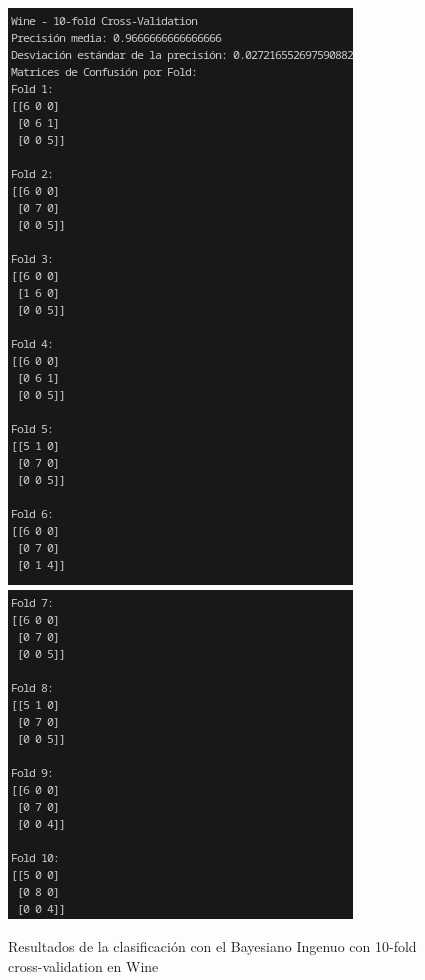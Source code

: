 \documentclass{article}
\begin{document}
    \begin{figure}[!h]
        \centering
        \includegraphics[scale=0.4]{10-fold-wine-1.jpg}
        \includegraphics[scale=0.6]{10-fold-wine-2.jpg}
        \caption{Resultados de la clasificación con el Bayesiano Ingenuo con 10-fold cross-validation en Wine}
    \end{figure}
\end{document}
